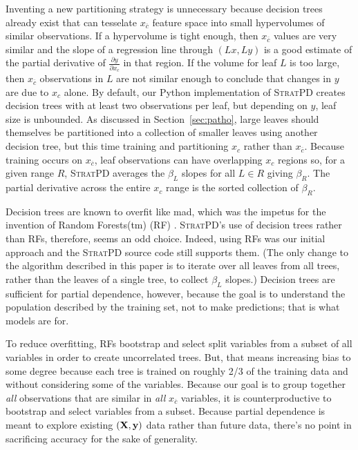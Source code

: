 \documentclass[12pt]{article}
\newcommand{\secref}[1]{Section~\ref{#1}}
\newcommand{\spd}{\fontfamily{cmr}\textsc{\small StratPD}}
\newcommand{\xnc}{$x_{\overline{c}}$}
\begin{document}
Inventing a new partitioning strategy is unnecessary because decision trees already exist that can tesselate \xnc{} feature space into small hypervolumes of similar observations. If a hypervolume is tight enough, then \xnc{} values are very similar and the slope of a regression line through $(Lx, Ly)$ is a good estimate of the partial derivative of $\frac{\partial y}{\partial x_{c}}$ in that region.  If the volume for leaf $L$ is too large, then \xnc{} observations in $L$ are not similar enough to conclude that changes in $y$ are due to $x_c$ alone. By default, our Python implementation of \spd{} creates decision trees with at least two observations per leaf, but depending on $y$, leaf size is unbounded. As discussed in \secref{sec:patho}, large leaves should themselves be partitioned into a collection of smaller leaves using another decision tree, but this time training and partitioning $x_c$ rather than \xnc{}.  Because training occurs on \xnc{}, leaf observations can have overlapping $x_c$ regions so, for a given range $R$, \spd{} averages the $\beta_L$ slopes for all $L \in R$ giving $\beta_R$.  The partial derivative across the entire $x_c$ range is the sorted collection of $\beta_R$.

Decision trees are known to overfit like mad, which was the impetus for the invention of Random Forests(tm) (RF) \cite{RF}.  \spd's use of decision trees rather than RFs, therefore, seems an odd choice. Indeed, using RFs was our initial approach and the \spd{} source code still supports them. (The only change to the algorithm described in this paper is to iterate over all leaves from all trees, rather than the leaves of a single tree, to collect $\beta_L$ slopes.)  Decision trees are sufficient for partial dependence, however, because the goal is to understand the population described by the training set, not to make predictions; that is what models are for. 

To reduce overfitting, RFs bootstrap and select split variables from a subset of all variables in order to create uncorrelated trees. But, that means increasing bias to some degree because each tree is trained on roughly 2/3 of the training data and without considering some of the variables. Because our goal is to group together {\em all} observations that are similar in {\em all} \xnc{} variables, it is counterproductive to bootstrap and select variables from a subset. Because partial dependence is meant to explore existing $(\bf X, y)$ data rather than future data, there's no point in sacrificing accuracy for the sake of generality. 
\end{document}
